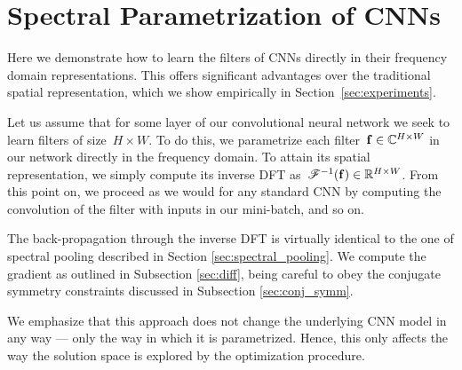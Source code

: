 \documentclass{article} %
\begin{document}
\section{Spectral Parametrization of CNNs}
\label{sec:spectral_representations}
Here we demonstrate how to learn the filters of CNNs directly in their frequency domain representations.  This offers significant advantages over the traditional spatial representation, which we show empirically in Section~\ref{sec:experiments}.

Let us assume that for some layer of our convolutional neural network we seek to learn filters of size~${H\times W}$. To do this, we parametrize each filter~${\boldsymbol{\mathrm{f}}\in\mathbb{C}^{H\times W}}$ in our network directly in the frequency domain. To attain its spatial representation, we simply compute its inverse DFT as~${\mathscr{F}^{-1}(\boldsymbol{\mathrm{f}})\in\mathbb{R}^{H\times W}}$. From this point on, we proceed as we would for any standard CNN by computing the convolution of the filter with inputs in our mini-batch, and so on.

The back-propagation through the inverse DFT is virtually identical to the one of spectral pooling described in Section \ref{sec:spectral_pooling}. We compute the gradient as outlined in Subsection \ref{sec:diff}, being careful to obey the conjugate symmetry constraints discussed in Subsection \ref{sec:conj_symm}. 

We emphasize that this approach does not change the underlying CNN model in any way --- only the way in which it is parametrized. Hence, this only affects the way the solution space is explored by the optimization procedure.
\end{document}
